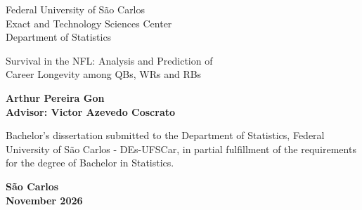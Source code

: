 
\clearpage{\thispagestyle{empty}\origcleardoublepage}
\thispagestyle{empty}
\begin{center}
{\large \sc Federal University of São Carlos \\
Exact and Technology Sciences Center \\
Department of Statistics} \\
\end{center}

\vspace*{2cm}

\begin{center}
{\Large Survival in the NFL: Analysis and Prediction of \\
Career Longevity among QBs, WRs and RBs}
\end{center}
\vspace{2.5cm}

\begin{center}
{\bf {\large Arthur Pereira Gon} \\ 
Advisor: Victor Azevedo Coscrato}
\end{center}
\vspace*{3cm}

\begin{flushright}
\begin{minipage}{0.55\textwidth}
Bachelor's dissertation submitted to the Department of Statistics,  Federal University of São Carlos - DEs-UFSCar, in partial fulfillment of the requirements for the degree of Bachelor in Statistics.\\ 
\end{minipage}
\end{flushright}
\vspace{2cm}

\begin{center} 
{\bf São Carlos\\
November 2026}
\end{center}